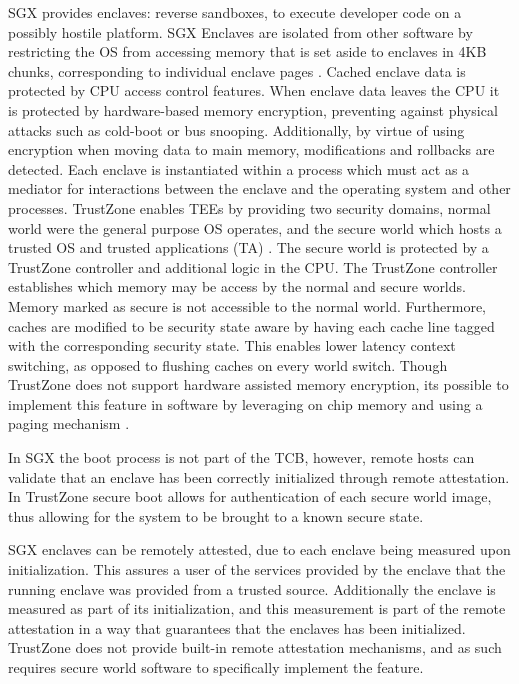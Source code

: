 SGX provides enclaves: reverse sandboxes, to execute developer code on a possibly hostile platform. SGX Enclaves are isolated from other software by restricting the OS from accessing memory that is set aside to enclaves in 4KB chunks, corresponding to individual enclave pages \cite{intelsgx}.
Cached enclave data is protected by CPU access control features.
When enclave data leaves the CPU it is protected by hardware-based memory encryption, preventing against physical attacks such as cold-boot or bus snooping.
Additionally, by virtue of using encryption when moving data to main memory, modifications and rollbacks are detected.
Each enclave is instantiated within a process which must act as a mediator for interactions between the enclave and the operating system and other processes. 
TrustZone enables TEEs by providing two security domains, normal world were the general purpose OS operates, and the secure world which hosts a trusted OS and trusted applications (TA) \cite{armtz}.
The secure world is protected by a TrustZone controller and additional logic in the CPU.
The TrustZone controller establishes which memory may be access by the normal and secure worlds.
Memory marked as secure is not accessible to the normal world.
Furthermore, caches are modified to be security state aware by having each cache line tagged with the corresponding security state.
This enables lower latency context switching, as opposed to flushing caches on every world switch.
Though TrustZone does not support hardware assisted memory encryption, its possible to implement this feature in software by leveraging on chip memory and using a paging mechanism \cite{SoftMe, OPTEE}.

In SGX the boot process is not part of the TCB, however, remote hosts can validate that an enclave has been correctly initialized through remote attestation.
In TrustZone secure boot allows for authentication of each secure world image, thus allowing for the system to be brought to a known secure state.

SGX enclaves can be remotely attested, due to each enclave being measured upon initialization.
This assures a user of the services provided by the enclave that the running enclave was provided from a trusted source.
Additionally the enclave is measured as part of its initialization, and this measurement is part of the remote attestation in a way that guarantees that the enclaves has been initialized.
TrustZone does not provide built-in remote attestation mechanisms, and as such requires secure world software to specifically implement the feature.

